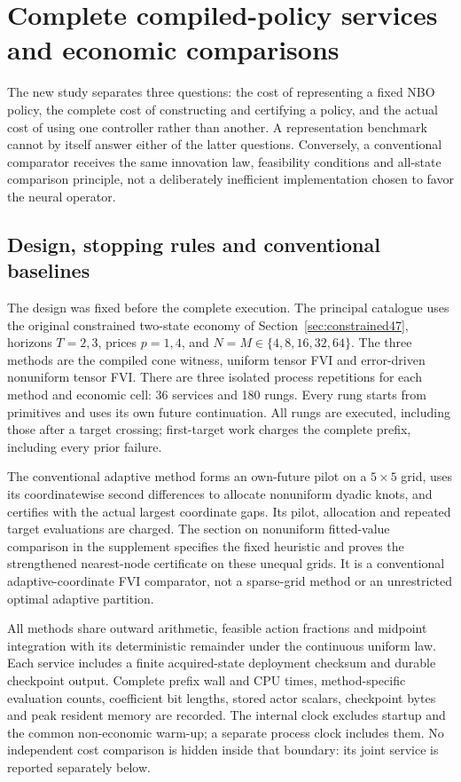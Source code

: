 \section{Complete compiled-policy services and economic comparisons}\label{sec:study48}
The new study separates three questions: the cost of representing a fixed NBO policy, the complete cost of constructing and certifying a policy, and the actual cost of using one controller rather than another. A representation benchmark cannot by itself answer either of the latter questions. Conversely, a conventional comparator receives the same innovation law, feasibility conditions and all-state comparison principle, not a deliberately inefficient implementation chosen to favor the neural operator.

\subsection{Design, stopping rules and conventional baselines}
The design was fixed before the complete execution. The principal catalogue uses the original constrained two-state economy of Section~\ref{sec:constrained47}, horizons $T=2,3$, prices $p=1,4$, and $N=M\in\{4,8,16,32,64\}$. The three methods are the compiled cone witness, uniform tensor FVI and error-driven nonuniform tensor FVI. There are three isolated process repetitions for each method and economic cell: 36 services and 180 rungs. Every rung starts from primitives and uses its own future continuation. All rungs are executed, including those after a target crossing; first-target work charges the complete prefix, including every prior failure.

The conventional adaptive method forms an own-future pilot on a $5\times5$ grid, uses its coordinatewise second differences to allocate nonuniform dyadic knots, and certifies with the actual largest coordinate gaps. Its pilot, allocation and repeated target evaluations are charged. The section on nonuniform fitted-value comparison in the supplement specifies the fixed heuristic and proves the strengthened nearest-node certificate on these unequal grids. It is a conventional adaptive-coordinate FVI comparator, not a sparse-grid method or an unrestricted optimal adaptive partition.

All methods share outward arithmetic, feasible action fractions and midpoint integration with its deterministic remainder under the continuous uniform law. Each service includes a finite acquired-state deployment checksum and durable checkpoint output. Complete prefix wall and CPU times, method-specific evaluation counts, coefficient bit lengths, stored actor scalars, checkpoint bytes and peak resident memory are recorded. The internal clock excludes startup and the common non-economic warm-up; a separate process clock includes them. No independent cost comparison is hidden inside that boundary: its joint service is reported separately below.

